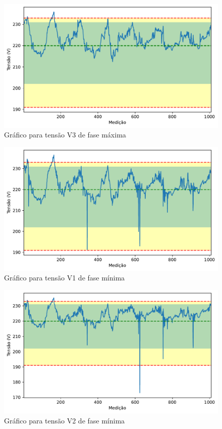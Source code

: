 \begin{figure}[H]
	\centering
	\caption{Gráfico para tensão V3 de fase máxima}
    \includegraphics[width=16cm]{illustrations/figures/a1_V3_Max.pdf}
\end{figure}

\begin{figure}[H]
	\centering
	\caption{Gráfico para tensão V1 de fase mínima}
    \includegraphics[width=16cm]{illustrations/figures/a1_V1_Min.pdf}
\end{figure}

\begin{figure}[H]
	\centering
	\caption{Gráfico para tensão V2 de fase mínima}
    \includegraphics[width=16cm]{illustrations/figures/a1_V2_Min.pdf}
\end{figure}

